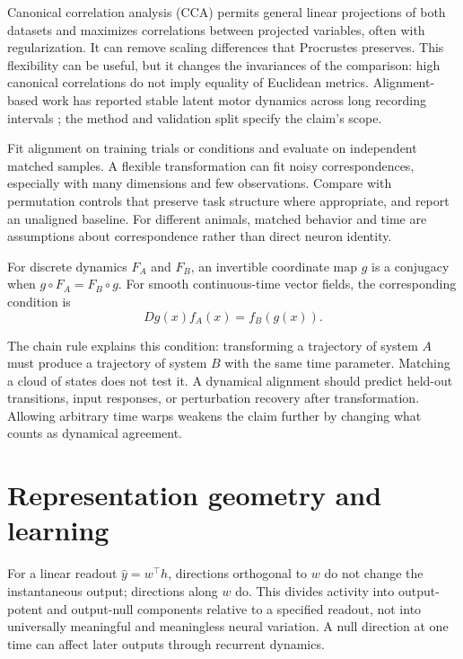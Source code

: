 Canonical correlation analysis (CCA) permits general linear projections of both datasets and maximizes correlations between projected variables, often with regularization. It can remove scaling differences that Procrustes preserves. This flexibility can be useful, but it changes the invariances of the comparison: high canonical correlations do not imply equality of Euclidean metrics. Alignment-based work has reported stable latent motor dynamics across long recording intervals \citep{app_gallego2020}; the method and validation split specify the claim's scope.

Fit alignment on training trials or conditions and evaluate on independent matched samples. A flexible transformation can fit noisy correspondences, especially with many dimensions and few observations. Compare with permutation controls that preserve task structure where appropriate, and report an unaligned baseline. For different animals, matched behavior and time are assumptions about correspondence rather than direct neuron identity.

\begin{definition}
For discrete dynamics $F_A$ and $F_B$, an invertible coordinate map $g$ is a conjugacy when $g\circ F_A=F_B\circ g$. For smooth continuous-time vector fields, the corresponding condition is
\begin{equation}
 Dg(x)f_A(x)=f_B(g(x)).\label{eq:08-conjugacy}
\end{equation}
\end{definition}
The chain rule explains this condition: transforming a trajectory of system $A$ must produce a trajectory of system $B$ with the same time parameter. Matching a cloud of states does not test it. A dynamical alignment should predict held-out transitions, input responses, or perturbation recovery after transformation. Allowing arbitrary time warps weakens the claim further by changing what counts as dynamical agreement.

\section{Representation geometry and learning}
For a linear readout $\hat y=w^\top h$, directions orthogonal to $w$ do not change the instantaneous output; directions along $w$ do. This divides activity into output-potent and output-null components relative to a specified readout, not into universally meaningful and meaningless neural variation. A null direction at one time can affect later outputs through recurrent dynamics.

